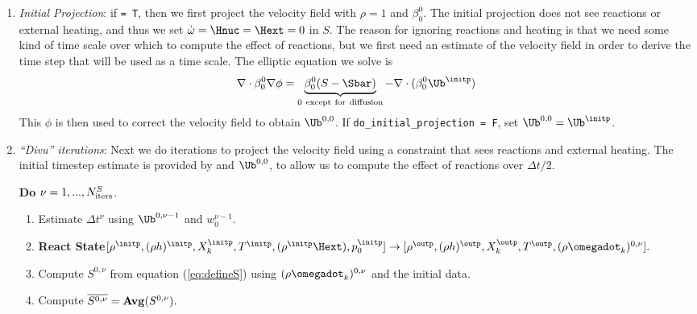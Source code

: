 \begin{enumerate}
\renewcommand{\theenumi}{{\bf \alph{enumi}}}
\renewcommand{\labelenumii}{\roman{enumii}.}

\item {\em Initial Projection}: if  {\tt = T}, then we 
   first project the velocity field with $\rho = 1$ and $\beta_0^0$.
   The initial projection does not see reactions
   or external heating, and thus we set $\dot\omega = \Hnuc = \Hext = 0$ in $S$.
   The reason for ignoring reactions and heating is that we need some kind of 
   time scale over which to compute the effect of reactions, but we first 
   need an estimate of the velocity
   field in order to derive the time step that will be used as a time scale.
   The elliptic equation we solve is 
   \begin{equation}
   \nabla \cdot \beta_0^0 \nabla \phi = \underbrace{\beta_0^0(S - \Sbar)}_\mathrm{0~ except~ for~ diffusion} - \nabla \cdot (\beta_0^0 \Ub^{\initp})
   \end{equation}
   This $\phi$ is then used to correct the velocity field to obtain $\Ub^{0,0}$.
   If {\tt do\_initial\_projection = F}, set $\Ub^{0,0} = \Ub^{\initp}$.

\item {\em ``Divu'' iterations}: Next we do  iterations 
  to project the velocity field using a constraint that sees reactions
  and external heating. 
  The initial timestep estimate is provided by  and
  $\Ub^{0,0}$, to allow us to compute the effect of reactions over $\Delta t/2$.

  {\bf Do} {$\nu = 1,...,N_{\rm iters}^{S}$.}
  \begin{enumerate}

  \item Estimate $\Delta t^\nu$ using $\Ub^{0,\nu-1}$ and $w_0^{\nu-1}.$

  \item {\bf React State}$[ \rho^{\initp},(\rho h)^{\initp}, X_k^{\initp}, T^{\initp}, 
(\rho^{\initp} \Hext), p_0^{\initp}] \rightarrow [\rho^{\outp}, (\rho h)^{\outp}, 
X_k^{\outp}, T^{\outp}, (\rho \omegadot_k)^{0,\nu} ].$

  \item Compute $S^{0,\nu}$ from equation (\ref{eq:defineS}) 
        using $(\rho \omegadot_k)^{0,\nu}$ and the initial data.

  \item Compute $\overline{S^{0,\nu}} = {\mathrm{\bf Avg}} (S^{0,\nu}).$


\end{enumerate}
\end{enumerate}
